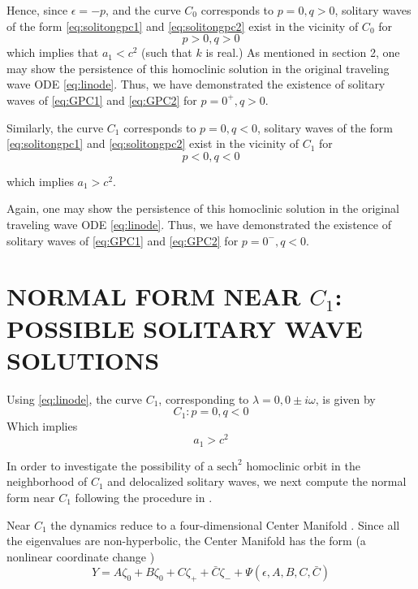 Hence, since $\epsilon = - p $, and the curve $C_0$ corresponds to $p=0,q>0$, solitary waves of the 
form \eqref{eq:solitongpc1} and \eqref{eq:solitongpc2} exist in the vicinity of $C_0$ for 
\begin{equation}
p > 0, q > 0 
\end{equation}
which implies that $a_1 < c^2 $ (such that $k$ is real.)  As mentioned in section 2, one may show the persistence
of this homoclinic solution in the original traveling wave ODE \eqref{eq:linode}. Thus, we have 
demonstrated the existence of solitary waves of \eqref{eq:GPC1} and \eqref{eq:GPC2}  for $p=0^+, q>0$. 

Similarly, the curve $C_1$ corresponds to $p=0,q<0$, solitary waves of the form \eqref{eq:solitongpc1} and \eqref{eq:solitongpc2} exist
in the vicinity of $C_1$ for 
\begin{equation}
p < 0, q < 0 
\end{equation}

which implies $ a_1 > c^2 $.

Again, one may show the persistence
of this homoclinic solution in the original traveling wave ODE \eqref{eq:linode}. Thus, we have 
demonstrated the existence of solitary waves of \eqref{eq:GPC1} and \eqref{eq:GPC2} for $p=0^-, q<0$.


\section{NORMAL FORM NEAR $C_1$: POSSIBLE SOLITARY WAVE SOLUTIONS}
Using \eqref{eq:linode}, the curve $C_1$, corresponding to $\lambda = 0, 0\pm i \omega$, is given by
\begin{equation}\label{eq:c1}
C_1 : { p = 0, q < 0 }
\end{equation}
Which implies
\begin{equation}
a_1 > c^2
\end{equation}

In order to investigate the possibility of a $ \mathrm{sech}^2 $  homoclinic orbit in the neighborhood of $C_1$ and delocalized solitary
waves, we next compute the normal form near $C_1$ following the procedure in \cite{IA}.

Near $C_1$ the dynamics reduce to a four-dimensional Center Manifold \cite{IA}.
Since all the eigenvalues are non-hyperbolic, the Center Manifold has the form (a nonlinear coordinate change \cite{IA})
\begin{equation} \label{eq:c1cm}
Y = A \zeta_0 + B \zeta_0 + C \zeta_+ + \bar{C} \zeta_- + \Psi(\epsilon,A,B,C,\bar{C})
\end{equation}

